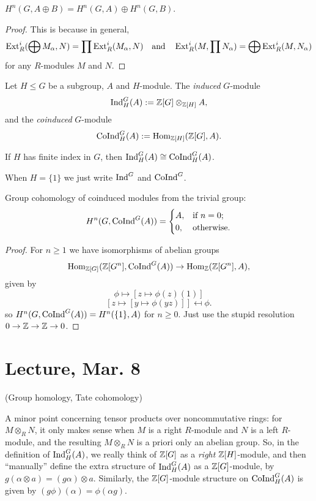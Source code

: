 \documentclass[11pt]{amsart}
\begin{document}
\begin{cor}
    $H^n(G,A\oplus B) = H^n(G,A) \oplus H^n(G,B)$.
\end{cor}

\begin{proof}
    This is because in general, 
    \[\operatorname{Ext}_R^i(\bigoplus M_\alpha, N) = \prod \operatorname{Ext}_R^i(M_\alpha, N) \quad \text{and} \quad \operatorname{Ext}_R^i(M, \prod N_\alpha) = \bigoplus \operatorname{Ext}_R^i(M, N_\alpha)\]
    for any $R$-modules $M$ and $N$.
\end{proof}


\begin{defn}
    Let $H\le G$ be a subgroup, $A$ and $H$-module. The \emph{induced} $G$-module
    \[\operatorname{Ind}_H^G(A) := \mathbb{Z}[G]\otimes_{\mathbb{Z}[H]} A,\]
    and the \emph{coinduced} $G$-module
    \[\operatorname{CoInd}_H^G(A) := \operatorname{Hom}_{\mathbb{Z}[H]}(\mathbb{Z}[G], A).\]
\end{defn}

\begin{thm}
    If $H$ has finite index in $G$, then $\operatorname{Ind}_H^G(A) \cong \operatorname{CoInd}_H^G(A)$.
\end{thm}

When $H = \{1\}$ we just write $\operatorname{Ind}^G$ and $\operatorname{CoInd}^G$.

\begin{lem}
    Group cohomology of coinduced modules from the trivial group:
    \[H^n(G,\operatorname{CoInd}^G(A)) = 
    \begin{cases}
    A, & \text{if } n = 0; \\
    0, & \text{otherwise.}
    \end{cases}\]
\end{lem}

\begin{proof}
    For $n\ge 1$ we have isomorphisms of abelian groups
    \[\operatorname{Hom}_{\mathbb{Z}[G]}(\mathbb{Z}[G^n], \operatorname{CoInd}^G(A)) \to \operatorname{Hom}_{\mathbb{Z}}(\mathbb{Z}[G^n], A),\]
    given by
    \[\phi \mapsto [z\mapsto \phi(z)(1)]\]
    \[[z\mapsto [y\mapsto \phi(yz)]]\mapsfrom \phi.\]
    so $H^n(G,\operatorname{CoInd}^G(A)) = H^n(\{1\}, A)$ for $n\ge 0$. Just use the stupid resolution $0\to \mathbb{Z}\to \mathbb{Z}\to 0$.
\end{proof}


\section{Lecture, Mar. 8}

(Group homology, Tate cohomology)

A minor point concerning tensor products over noncommutative rings: for $M\otimes_R N$, it only makes sense when $M$ is a right $R$-module and $N$ is a left $R$-module, and the resulting $M\otimes_R N$ is a priori only an abelian group. So, in the definition of $\operatorname{Ind}_H^G(A)$, we really think of $\mathbb{Z}[G]$ as a \emph{right} $\mathbb{Z}[H]$-module, and then ``manually'' define the extra structure of $\operatorname{Ind}_H^G(A)$ as a $\mathbb{Z}[G]$-module, by $g(\alpha\otimes a) = (g\alpha) \otimes a$. Similarly, the $\mathbb{Z}[G]$-module structure on $\operatorname{CoInd}_H^G(A)$ is given by $(g\phi)(\alpha) = \phi(\alpha g)$.
\end{document}
